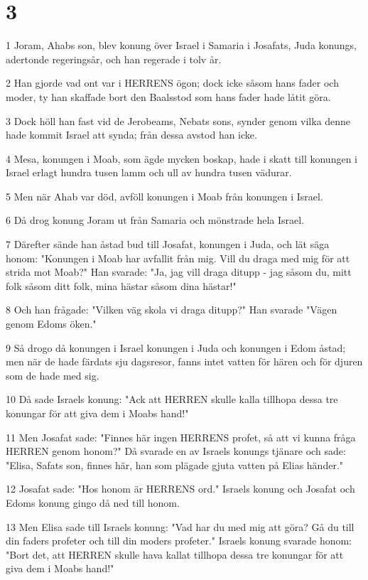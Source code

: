 \chapter{3}

\par 1 Joram, Ahabs son, blev konung över Israel i Samaria i Josafats, Juda konungs, adertonde regeringsår, och han regerade i tolv år.
\par 2 Han gjorde vad ont var i HERRENS ögon; dock icke såsom hans fader och moder, ty han skaffade bort den Baalsstod som hans fader hade låtit göra.
\par 3 Dock höll han fast vid de Jerobeams, Nebats sons, synder genom vilka denne hade kommit Israel att synda; från dessa avstod han icke.
\par 4 Mesa, konungen i Moab, som ägde mycken boskap, hade i skatt till konungen i Israel erlagt hundra tusen lamm och ull av hundra tusen vädurar.
\par 5 Men när Ahab var död, avföll konungen i Moab från konungen i Israel.
\par 6 Då drog konung Joram ut från Samaria och mönstrade hela Israel.
\par 7 Därefter sände han åstad bud till Josafat, konungen i Juda, och lät säga honom: "Konungen i Moab har avfallit från mig. Vill du draga med mig för att strida mot Moab?" Han svarade: "Ja, jag vill draga ditupp - jag såsom du, mitt folk såsom ditt folk, mina hästar såsom dina hästar!"
\par 8 Och han frågade: "Vilken väg skola vi draga ditupp?" Han svarade "Vägen genom Edoms öken."
\par 9 Så drogo då konungen i Israel konungen i Juda och konungen i Edom åstad; men när de hade färdats sju dagsresor, fanns intet vatten för hären och för djuren som de hade med sig.
\par 10 Då sade Israels konung: "Ack att HERREN skulle kalla tillhopa dessa tre konungar för att giva dem i Moabs hand!"
\par 11 Men Josafat sade: "Finnes här ingen HERRENS profet, så att vi kunna fråga HERREN genom honom?" Då svarade en av Israels konungs tjänare och sade: "Elisa, Safats son, finnes här, han som plägade gjuta vatten på Elias händer."
\par 12 Josafat sade: "Hos honom är HERRENS ord." Israels konung och Josafat och Edoms konung gingo då ned till honom.
\par 13 Men Elisa sade till Israels konung: "Vad har du med mig att göra? Gå du till din faders profeter och till din moders profeter." Israels konung svarade honom: "Bort det, att HERREN skulle hava kallat tillhopa dessa tre konungar för att giva dem i Moabs hand!"
